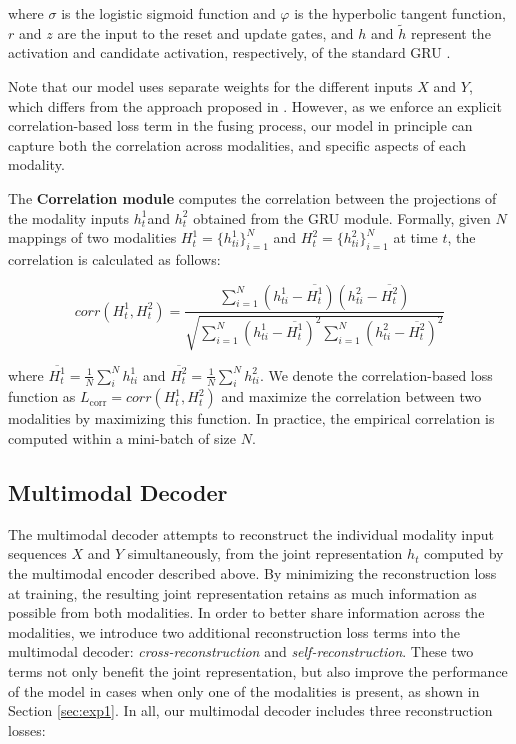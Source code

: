 \documentclass[10pt,twocolumn,letterpaper]{article}
\begin{document}
\noindent where $\sigma$ is the logistic sigmoid function and $\varphi$ is the hyperbolic tangent function, $r$ and $z$ are the input to the reset and update gates, and $h$ and $\tilde{h}$ represent the activation and candidate activation, respectively, of the standard GRU \cite{ChoMGBBSB14}.

Note that our model uses separate weights for the different inputs $X$ and $Y$, which differs from the approach proposed in \cite{ren2016look}. However, as we enforce an explicit correlation-based loss term in the fusing process, our model in principle can capture both the correlation across modalities, and specific aspects of each modality. 


The \textbf{Correlation module} computes the correlation between the projections of the modality inputs  $h_t^1$and $h_t^2$ obtained from the GRU module. Formally, given $N$ mappings of two modalities $H_t^1 = \{h_{ti}^1\}_{i=1}^N$ and $H_t^2 = \{h_{ti}^2\}_{i=1}^N$ at time $t$, the correlation is calculated as follows:

$$corr(H_t^1, H_t^2) =
\frac{\sum_{i=1}^N (h_{ti}^1-\overline{H_t^1}) (h_{ti}^2-\overline{H_t^2})} {\sqrt{\sum_{i=1}^N (h_{ti}^1-\overline{H_t^1})^2 \sum_{i=1}^N (h_{ti}^2-\overline{H_t^2})^2}}
$$

\noindent where $\overline{H_t^1} = \frac{1}{N} \sum_i^N{h_{ti}^1}$ and $\overline{H_t^2} = \frac{1}{N} \sum_i^N{h_{ti}^2}$. We denote the correlation-based loss function as $L_{\text{corr}} = corr(H_t^1, H_t^2)$ and maximize the correlation between two modalities by maximizing this function. In practice, the empirical correlation is computed within a mini-batch of size $N$.

\subsection{Multimodal Decoder}
\label{sec:decoder}
The multimodal decoder attempts to reconstruct the individual modality input sequences $X$ and $Y$ simultaneously, from the joint representation $h_t$ computed by the multimodal encoder described above. By minimizing the reconstruction loss at training, the resulting joint representation retains as much information as possible from both modalities. In order to better share information across the modalities, we introduce two additional reconstruction loss terms into the multimodal decoder: \textit{cross-reconstruction} and \textit{self-reconstruction}. These two terms not only benefit the joint representation, but also improve the performance of the model in cases when only one of the modalities is present, as shown in Section \ref{sec:exp1}. In all, our multimodal decoder includes three reconstruction losses:
\end{document}
